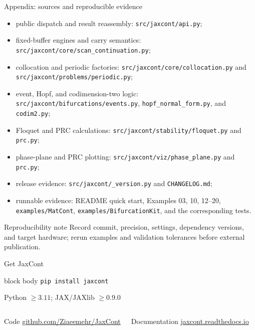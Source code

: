 \begin{frame}{Appendix: sources and reproducible evidence}
\scriptsize
\begin{itemize}
  \item public dispatch and result reassembly: \texttt{src/jaxcont/api.py};
  \item fixed-buffer engines and carry semantics: \texttt{src/jaxcont/core/scan\_continuation.py};
  \item collocation and periodic factories: \texttt{src/jaxcont/core/collocation.py} and
        \texttt{src/jaxcont/problems/periodic.py};
  \item event, Hopf, and codimension-two logic: \texttt{src/jaxcont/bifurcations/events.py},
        \texttt{hopf\_normal\_form.py}, and \texttt{codim2.py};
  \item Floquet and PRC calculations: \texttt{src/jaxcont/stability/floquet.py} and \texttt{prc.py};
  \item phase-plane and PRC plotting: \texttt{src/jaxcont/viz/phase\_plane.py} and \texttt{prc.py};
  \item release evidence: \texttt{src/jaxcont/\_version.py} and \texttt{CHANGELOG.md};
  \item runnable evidence: README quick start, Examples 03, 10, 12--20,
        \texttt{examples/MatCont}, \texttt{examples/BifurcationKit}, and the corresponding tests.
\end{itemize}

\begin{block}{Reproducibility note}
Record commit, precision, settings, dependency versions, and target hardware;
rerun examples and validation tolerances before external publication.
\end{block}
\end{frame}

\begin{frame}{Get JaxCont}
\centering
\vspace{4mm}
\begin{beamercolorbox}[sep=8pt,center,rounded=true]{block body}
\Large\texttt{pip install jaxcont}
\end{beamercolorbox}

\vspace{3mm}
{\small Python $\geq3.11$; JAX/JAXlib $\geq0.9.0$}

\vspace{5mm}
\begin{columns}[T,onlytextwidth]
\begin{block}{Code}
\centering\small
\href{https://github.com/Ziaeemehr/JaxCont}{github.com/Ziaeemehr/JaxCont}
\end{block}
\begin{block}{Documentation}
\centering\small
\href{https://jaxcont.readthedocs.io/en/latest/index.html}{jaxcont.readthedocs.io}
\end{block}
\end{columns}
\end{frame}
